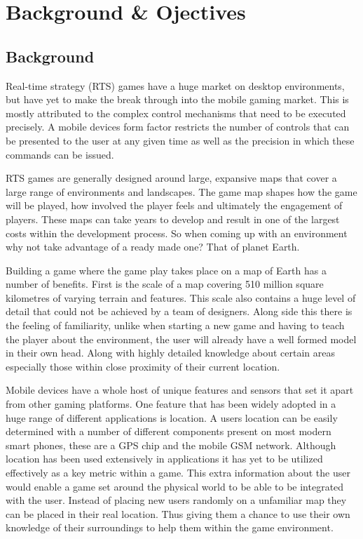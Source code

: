 \chapter{Background \& Ojectives}

\section{Background}
Real-time strategy (RTS) games have a huge market on desktop environments, but have yet to make the break through into the mobile gaming market. This is mostly attributed to the complex control mechanisms that need to be executed precisely. A mobile devices form factor restricts the number of controls that can be presented to the user at any given time as well as the precision in which these commands can be issued.

RTS games are generally designed around large, expansive maps that cover a large range of environments and landscapes. The game map shapes how the game will be played, how involved the player feels and ultimately the engagement of players. These maps can take years to develop and result in one of the largest costs within the development process. So when coming up with an environment why not take advantage of a ready made one? That of planet Earth.

Building a game where the game play takes place on a map of Earth has a number of benefits. First is the scale of a map covering 510 million square kilometres of varying terrain and features. This scale also contains a huge level of detail that could not be achieved by a team of designers. Along side this there is the feeling of familiarity, unlike when starting a new game and having to teach the player about the environment, the user will already have a well formed model in their own head. Along with highly detailed knowledge about certain areas especially those within close proximity of their current location.

Mobile devices have a whole host of unique features and sensors that set it apart from other gaming platforms. One feature that has been widely adopted in a huge range of different applications is location. A users location can be easily determined with a number of different components present on most modern smart phones, these are a GPS chip and the mobile GSM network. Although location has been used extensively in applications it has yet to be utilized effectively as a key metric within a game. This extra information about the user would enable a game set around the physical world to be able to be integrated with the user. Instead of placing new users randomly on a unfamiliar map they can be placed in their real location. Thus giving them a chance to use their own knowledge of their surroundings to help them within the game environment.


